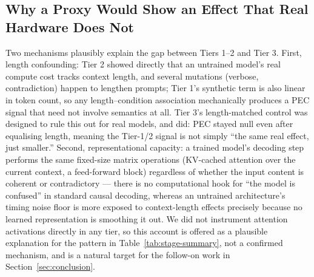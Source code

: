 \documentclass[conference]{IEEEtran}
\begin{document}
\subsection{Why a Proxy Would Show an Effect That Real Hardware Does Not}
Two mechanisms plausibly explain the gap between Tiers 1--2 and Tier
3. First, length confounding: Tier 2 showed directly that an untrained
model's real compute cost tracks context length, and several mutations
(verbose, contradiction) happen to lengthen prompts; Tier 1's synthetic
term is also linear in token count, so any length--condition
association mechanically produces a PEC signal that need not involve
semantics at all. Tier 3's length-matched control was designed to rule
this out for real models, and did: PEC stayed null even after
equalising length, meaning the Tier-1/2 signal is not simply ``the
same real effect, just smaller.'' Second, representational capacity:
a trained model's decoding step performs the same fixed-size matrix
operations (KV-cached attention over the current context, a
feed-forward block) regardless of whether the input content is
coherent or contradictory --- there is no computational hook for
``the model is confused'' in standard causal decoding, whereas an
untrained architecture's timing noise floor is more exposed to
context-length effects precisely because no learned representation is
smoothing it out. We did not instrument attention activations directly
in any tier, so this account is offered as a plausible explanation for
the pattern in Table~\ref{tab:stage-summary}, not a confirmed
mechanism, and is a natural target for the follow-on work in
Section~\ref{sec:conclusion}.
\end{document}
